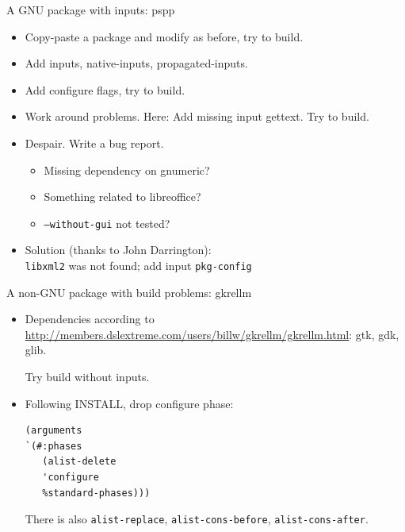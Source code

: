 \documentclass [t]{beamer}
\begin{document}
\begin {frame}{A GNU package with inputs: pspp}
\begin {itemize}
\item
\textcolor {blau}{Copy-paste} a package and modify as before,
try to build.
\pause
\item
Add \textcolor {blau}{inputs}, \textcolor {blau}{native-inputs},
\textcolor {blau}{propagated-inputs}.
\item
Add \textcolor {blau}{configure flags}, try to build.
\pause
\item
Work around \textcolor {blau}{problems}.
Here: Add missing input gettext.
Try to build.
\pause
\item
Despair. Write a bug report.
\begin {itemize}
\item
Missing dependency on gnumeric?
\item
Something related to libreoffice?
\item
\texttt {--without-gui} not tested?
\end {itemize}
\item
Solution (thanks to John Darrington): \\
\texttt {libxml2} was not found; add input \texttt {pkg-config}
\end {itemize}
\end {frame}


\begin{frame}[fragile]{A non-GNU package with build problems: gkrellm}
\begin {itemize}
\item
Dependencies according to
\url {http://members.dslextreme.com/users/billw/gkrellm/gkrellm.html}:
gtk, gdk, glib.

Try build without inputs.
\pause
\item
Following INSTALL, drop configure phase:
\begin{verbatim}
(arguments
`(#:phases
   (alist-delete
   'configure
   %standard-phases)))
\end{verbatim}
There is also \texttt {alist-replace}, \texttt {alist-cons-before},
\texttt {alist-cons-after}.
\end {itemize}
\end{frame}
\end{document}
